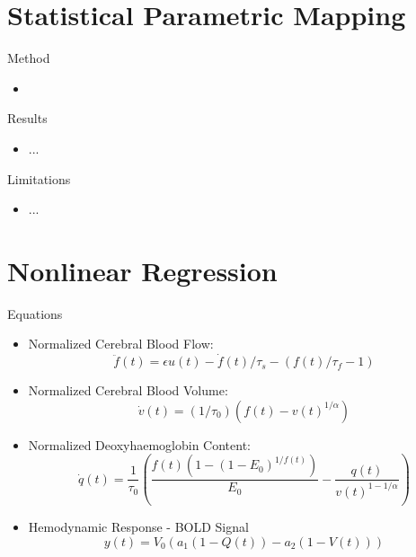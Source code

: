 \documentclass{beamer}
\begin{document}
\section{Statistical Parametric Mapping}
\begin{frame}{Method}
  \begin{itemize}
    \item
  \end{itemize}
\end{frame}

\begin{frame}{Results}
  \begin{itemize}
    \item ...
  \end{itemize}
\end{frame}

\begin{frame}{Limitations}
  \begin{itemize}
    \item ...
  \end{itemize}
\end{frame}

\section{Nonlinear Regression}
\begin{frame}{Equations}
  \begin{itemize}
    \item Normalized Cerebral Blood Flow:
    $$\ddot{f}(t) = \epsilon u(t) - \dot{f}(t)/\tau_s - (f(t)/\tau_f - 1)$$
    \item Normalized Cerebral Blood Volume:
    $$\dot{v}(t) = (1/\tau_0)( f(t) - v(t) ^ {1/\alpha}) $$
    \item Normalized Deoxyhaemoglobin Content:
    $$\dot{q}(t) = \frac{1}{\tau_0}\left(\frac{f(t)(1- (1-E_0)^{1/f(t)})}{E_0} - 
            \frac{q(t)}{v(t)^{1-1/\alpha}}\right)$$
    \item Hemodynamic Response - BOLD Signal
    $$y(t) = V_0(a_1( 1 - Q(t)) - a_2(1 - V(t)))$$
  \end{itemize}
\end{frame}
\end{document}
